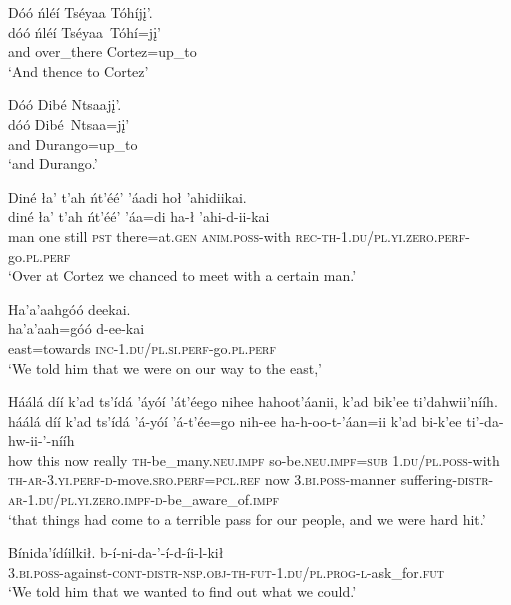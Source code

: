 \ea\label{ex:text7-9-11}
Dóó ńléí Tséyaa Tóhíjį’.\\
\gll dóó	ńléí	Tséyaa~{Tóhí=jį’}\\
     and	over\_there	Cortez=up\_to\\
\glt `And thence to Cortez'
\z

\newpage
\ea\label{ex:text7-9-12}
Dóó Dibé Ntsaajį’.\\
\gll dóó	Dibé~{Ntsaa=jį’}\\
     and	Durango=up\_to\\
\glt `and Durango.'
\z

\ea\label{ex:text7-10-1}
Diné ła’ t’ah ńt’éé’ ’áadi hoł ’ahidiikai.\\
\gll diné	ła’	t’ah	ńt’éé’	’áa=di	ha-ł	’ahi-d-ii-kai\\
     man	one	still	\textsc{pst}	there=at.\textsc{gen}	\textsc{anim}.\textsc{poss}-with	\textsc{rec}-\textsc{th}-1.\textsc{du}/\textsc{pl}.\textsc{yi}.\textsc{zero}.\textsc{perf}-go.\textsc{pl}.\textsc{perf}\\
\glt `Over at Cortez we chanced to meet with a certain man.'
\z

\ea\label{ex:text7-10-2}
Ha’a’aahgóó deekai.\\
\gll ha’a’aah=góó	d-ee-kai\\
     east=towards	\textsc{inc}-1.\textsc{du}/\textsc{pl}.\textsc{si}.\textsc{perf}-go.\textsc{pl}.\textsc{perf}\\
\glt `We told him that we were on our way to the east,'
\z

\ea\label{ex:text7-10-3}
Háálá díí k’ad ts’ídá ’áyóí ’át’éego nihee hahoot’áanii, k’ad bik’ee ti’dahwii’nííh.\\
\gll háálá	díí	k’ad	ts’ídá	’á-yóí	’á-t’ée=go	nih-ee	ha-h-oo-t-’áan=ii	k’ad	bi-k’ee	ti’-da-hw-ii-’-nííh\\
     how	this	now	really	\textsc{th}-be\_many.\textsc{neu}.\textsc{impf}	so-be.\textsc{neu}.\textsc{impf}=\textsc{sub}	1.\textsc{du}/\textsc{pl}.\textsc{poss}-with	\textsc{th}-\textsc{ar}-3.\textsc{yi}.\textsc{perf}-\textsc{d}-move.\textsc{sro}.\textsc{perf}=\textsc{pcl}.\textsc{ref}	now	3.\textsc{bi}.\textsc{poss}-manner	suffering-\textsc{distr}-\textsc{ar}-1.\textsc{du}/\textsc{pl}.\textsc{yi}.\textsc{zero}.\textsc{impf}-\textsc{d}-be\_aware\_of.\textsc{impf}\\
\glt `that things had come to a terrible pass for our people, and we were hard hit.'
\z

\ea\label{ex:text7-10-4}
Bínida’ídíilkił.
\gll b-í-ni-da-’-í-d-íi-l-kił\\
     3.\textsc{bi}.\textsc{poss}-against-\textsc{cont}-\textsc{distr}-\textsc{nsp}.\textsc{obj}-\textsc{th}-\textsc{fut}-1.\textsc{du}/\textsc{pl}.\textsc{prog}-\textsc{l}-ask\_for.\textsc{fut}\\
\glt `We told him that we wanted to find out what we could.'
\z

